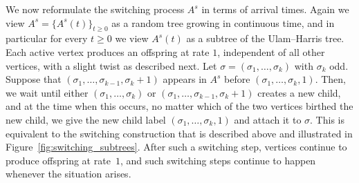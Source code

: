 \documentclass[11pt]{article}
\numberwithin{equation}{section}
\theoremstyle{definition}
\begin{document}
We now reformulate the switching process  $A^{s}$ in terms of arrival times. 
Again we view $A^{s} = \{ A^{s}(t) \}_{t \geq 0}$ as a random tree growing in continuous time, 
and in particular for every $t \geq 0$ we view $A^{s}(t)$ as a subtree of the Ulam--Harris tree. 
Each active vertex produces an offspring at rate $1$, independent of all other vertices, with a slight twist as described next. 
Let $\sigma = (\sigma_{1}, \ldots, \sigma_{k})$ with $\sigma_{k}$ odd. 
Suppose that $(\sigma_{1}, \ldots, \sigma_{k-1}, \sigma_{k} + 1)$ appears in $A^{s}$ before $(\sigma_{1}, \ldots, \sigma_{k},1)$. 
Then, we wait until either $(\sigma_{1}, \ldots, \sigma_{k})$ or $(\sigma_{1}, \ldots, \sigma_{k-1}, \sigma_{k}+1)$ creates a new child, 
and at the time when this occurs, no matter which of the two vertices birthed the new child, 
we give the new child label $(\sigma_{1}, \ldots, \sigma_{k},1)$ and attach it to $\sigma$. 
This is equivalent to the switching construction that is described above and illustrated in Figure~\ref{fig:switching_subtrees}. 
After such a switching step, vertices continue to produce offspring at rate~$1$, and such switching steps continue to happen whenever the situation arises. 
\end{document}
